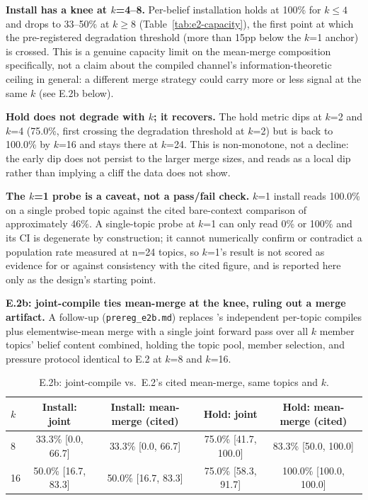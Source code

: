 \textbf{Install has a knee at \(k\)=4--8.} Per-belief installation holds at 100\% for
\(k \le 4\) and drops to 33--50\% at \(k \ge 8\) (Table~\ref{tab:e2-capacity}), the first
point at which the pre-registered degradation threshold (more than 15pp below the
\(k\)=1 anchor) is crossed. This is a genuine capacity limit on the mean-merge
composition specifically, not a claim about the compiled channel's information-theoretic
ceiling in general: a different merge strategy could carry more or less signal at the
same \(k\) (see E.2b below).

\textbf{Hold does not degrade with \(k\); it recovers.} The hold metric dips at \(k\)=2
and \(k\)=4 (75.0\%, first crossing the degradation threshold at \(k\)=2) but is back to
100.0\% by \(k\)=16 and stays there at \(k\)=24. This is non-monotone, not a decline: the
early dip does not persist to the larger merge sizes, and reads as a local
dip rather than implying a cliff the data does not show.

\textbf{The \(k\)=1 probe is a caveat, not a pass/fail check.} \(k\)=1 install reads
100.0\% on a single probed topic against the cited bare-context comparison of
approximately 46\%. A single-topic probe at \(k\)=1 can only read 0\% or 100\% and its CI
is degenerate by construction; it cannot numerically confirm or contradict a population
rate measured at n=24 topics, so \(k\)=1's result is not scored as evidence for or
against consistency with the cited figure, and is reported here only as the design's
starting point.

\textbf{E.2b: joint-compile ties mean-merge at the knee, ruling out a merge artifact.}
A follow-up (\texttt{prereg\_e2b.md}) replaces \condF{}'s independent per-topic compiles
plus elementwise-mean merge with a single joint forward pass over all \(k\) member
topics' belief content combined, holding the topic pool, member selection, and pressure
protocol identical to E.2 at \(k\)=8 and \(k\)=16.

\begin{table}[h]
\centering
\caption{E.2b: joint-compile vs.\ E.2's cited mean-merge, same topics and \(k\).}
\label{tab:e2b-joint}
\begin{tabular}{lcccc}
\toprule
\(k\) & Install: joint & Install: mean-merge (cited) & Hold: joint & Hold: mean-merge (cited) \\
\midrule
8 & 33.3\% [0.0, 66.7] & 33.3\% [0.0, 66.7] & 75.0\% [41.7, 100.0] & 83.3\% [50.0, 100.0] \\
16 & 50.0\% [16.7, 83.3] & 50.0\% [16.7, 83.3] & 75.0\% [58.3, 91.7] & 100.0\% [100.0, 100.0] \\
\bottomrule
\end{tabular}
\end{table}

